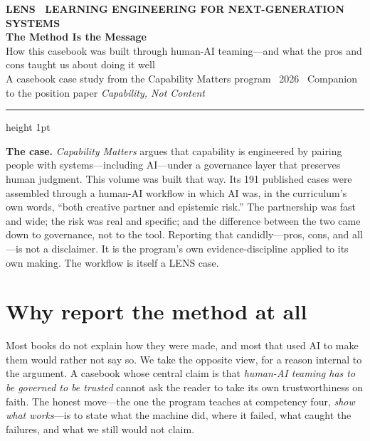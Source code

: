\documentclass[11pt]{article}
\newcommand{\lead}[1]{{\color{lensaccent}\bfseries #1}}
\begin{document}
\begin{flushleft}
{\footnotesize\color{lensaccent}\bfseries LENS \textbullet\ LEARNING ENGINEERING FOR NEXT-GENERATION SYSTEMS}\\[0.9em]
{\color{lensink}\fontsize{27}{31}\selectfont\bfseries The Method Is the Message}\\[0.35em]
{\color{lensink}\large How this casebook was built through human-AI teaming---and what the pros and cons taught us about doing it well}\\[1.1em]
{\footnotesize\color{lensquote}A casebook case study from the Capability Matters program \textbullet\ 2026 \textbullet\ Companion to the position paper \emph{Capability, Not Content}}
\end{flushleft}

\vspace{0.3em}
{\color{lensrule}\hrule height 1pt}
\vspace{1.2em}

\begin{thesisbox}
\lead{The case.} \emph{Capability Matters} argues that capability is engineered by pairing people with systems---including AI---under a governance layer that preserves human judgment. This volume was built that way. Its 191 published cases were assembled through a human-AI workflow in which AI was, in the curriculum's own words, ``both creative partner and epistemic risk.'' The partnership was fast and wide; the risk was real and specific; and the difference between the two came down to governance, not to the tool. Reporting that candidly---pros, cons, and all---is not a disclaimer. It is the program's own evidence-discipline applied to its own making. The workflow is itself a LENS case.
\end{thesisbox}

\section{Why report the method at all}

Most books do not explain how they were made, and most that used AI to make them would rather not say so. We take the opposite view, for a reason internal to the argument. A casebook whose central claim is that \emph{human-AI teaming has to be governed to be trusted} cannot ask the reader to take its own trustworthiness on faith. The honest move---the one the program teaches at competency four, \emph{show what works}---is to state what the machine did, where it failed, what caught the failures, and what we still would not claim.
\end{document}
